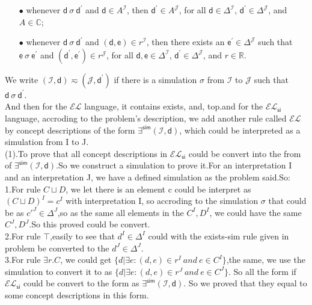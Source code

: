 \documentclass{article}
\begin{document}
    \begin{itemize}
        \item[$\bullet$] whenever $\textsf{d}~\sigma~\textsf{d}^{\prime}$ and $\textsf{d}\in A^{\mathcal{I}}$, then $\textsf{d}^{\prime}\in A^{\mathcal{J}}$, for all $\textsf{d}\in\Delta^{\mathcal{I}}$, $\textsf{d}^{\prime}\in\Delta^{\mathcal{J}}$, and $A\in\mathbb{C}$;
        \item[$\bullet$] whenever $\textsf{d}~\sigma~\textsf{d}^{\prime}$ and $(\textsf{d},\textsf{e})\in r^{\mathcal{I}}$, then there exists an $\textsf{e}^{\prime}\in\Delta^{\mathcal{J}}$ such that $\textsf{e}~\sigma~\textsf{e}^{\prime}$ and $(\textsf{d}^{\prime},\textsf{e}^{\prime})\in r^{\mathcal{J}}$, for all $\textsf{d},\textsf{e}\in\Delta^{\mathcal{I}}$, $\textsf{d}^{\prime}\in\Delta^{\mathcal{J}}$, and $r\in\mathbb{R}$.
    \end{itemize}
    We write $(\mathcal{I},\textsf{d})\eqsim(\mathcal{J},\textsf{d}^{\prime})$ if there is a simulation $\sigma$ from $\mathcal{I}$ to $\mathcal{J}$ such that $\textsf{d}~\sigma~\textsf{d}^{\prime}$.\\
    And then for the $\mathcal{EL}$ language, it contains exists, and, top.and for the $\mathcal{EL}_\textsf{si}$ language, accroding to the problem's description, we add another rule called $\mathcal{EL}$ by concept descriptions of the form $\exists^{\textsf{sim}}(\mathcal{I},\textsf{d})$, which could be interpreted as a simulation from I to J.\\
    
    (1).To prove that all concept descriptions in $\mathcal{EL}_\textsf{si}$ could be convert into the from of $\exists^{\textsf{sim}}(\mathcal{I},\textsf{d})$.So we construct a simulation to prove it.For an interpretation I and an interpretation J, we have a defined simulation as the problem said.So:\\
    1.For rule $C \sqcup D$, we let there is an element c could be interpret as $(C\sqcup D)^I=c^I$ with interpretation I, so accroding to the simulation $\sigma$ that could be as $c'^J \in \Delta^J$,so as the same all elements in the $C^I,D^I$, we could have the same $C^J,D^J$.So this proved could be convert.\\
    2.For rule $\top$,easily to see that $d^I\in \Delta^I$ could with the exists-sim rule given in problem be converted to the $d^J\in \Delta^J$.\\
    3.For rule $\exists r.C$, we could get $\{d|\exists e:(d,e)\in r^I\ and\ e\in C^I\}$,the same, we use the simulation to convert it to as $\{d|\exists e:(d,e)\in r^J\ and\ e\in C^J\}$.
    So all the form if  $\mathcal{EL}_\textsf{si}$ could be convert to the form as $\exists^{\textsf{sim}}(\mathcal{I},\textsf{d})$. So we proved that they equal to some concept descriptions in this form.\\  
    
\end{document}
